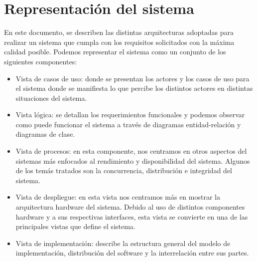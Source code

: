 \chapter{Representación del sistema}
En este documento, se describen las distintas arquitecturas adoptadas para realizar un sistema que cumpla con los requisitos solicitados con la máxima calidad posible. Podemos representar el sistema como un conjunto de los siguientes componentes:
 \begin{itemize}
 \item Vista de casos de uso: donde se presentan los actores y los casos de uso para el sistema donde se manifiesta lo que percibe los distintos actores en distintas situaciones del sistema. 
 \item Vista lógica: se detallan los requerimientos funcionales y podemos observar como puede funcionar el sistema a través de diagramas entidad-relación y diagramas de clase.
 \item Vista de procesos: en esta componente, nos centramos en otros aspectos del sistemas más enfocados al rendimiento y disponibilidad del sistema. Algunos de los temás tratados son la concurrencia, distribución e integridad del sistema.
 \item Vista de despliegue: en esta vista nos centramos más en mostrar la arquitectura hardware del sistema. Debido al uso de distintos componentes hardware y a sus respectivas interfaces, esta vista se convierte en una de las principales vistas que define el sistema.
 \item Vista de implementación: describe la estructura general del modelo de implementación, distribución del software y la interrelación entre sus partes.
 \end{itemize}
